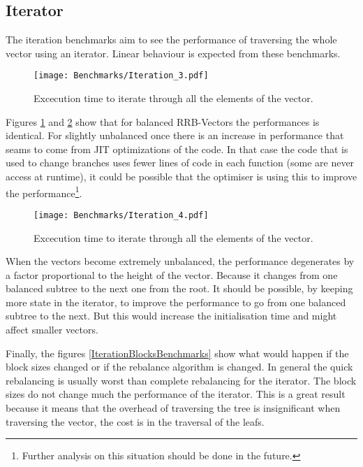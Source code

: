 \FloatBarrier

\subsection{Iterator}
The iteration benchmarks aim to see the performance of traversing the whole vector using an iterator. Linear behaviour is expected from these benchmarks.

\begin{figure}[h!]
  \centering
  \texttt{[image: Benchmarks/Iteration\_3.pdf]}
  \caption{Excecution time to iterate through all the elements of the vector.}
  \label{Iteration2Benchmarks}
\end{figure}

Figures \ref{Iteration2Benchmarks} and \ref{Iteration3Benchmarks} show that for balanced RRB-Vectors the performances is identical. For slightly unbalanced once there is an increase in performance that seams to come from JIT optimizations of the code. In that case the code that is used to change branches uses fewer lines of code in each function (some are never access at runtime), it could be possible that the optimiser is using this to improve the performance\footnote{Further analysis on this situation should be done in the future.}. 

\begin{figure}[h!]
  \centering
  \texttt{[image: Benchmarks/Iteration\_4.pdf]}
  \caption{Excecution time to iterate through all the elements of the vector.}
  \label{Iteration3Benchmarks}
\end{figure}

When the vectors become extremely unbalanced, the performance degenerates by a factor proportional to the height of the vector. Because it changes from one balanced subtree to the next one from the root. It should be possible, by keeping more state in the iterator, to improve the performance to go from one balanced subtree to the next. But this would increase the initialisation time and might affect smaller vectors.

\FloatBarrier

Finally, the figures \ref{IterationBlocksBenchmarks} show what would happen if the block sizes changed or if the rebalance algorithm is changed. In general the quick rebalancing is usually worst than complete rebalancing for the iterator. The block sizes do not change much the performance of the iterator. This is a great result because it means that the overhead of traversing the tree is insignificant when traversing the vector, the cost is in the traversal of the leafs.

